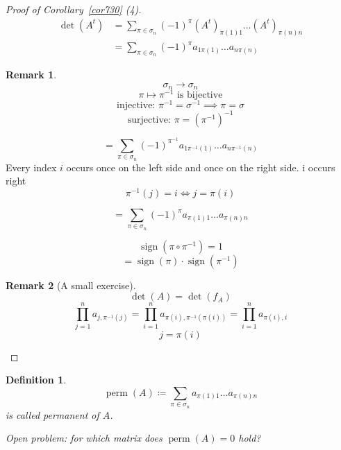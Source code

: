 \documentclass{article}
\newtheorem{definition}{Definition}  \numberwithin{definition}{section}
\newtheorem{remark}{Remark}  \numberwithin{remark}{section}
\DeclareMathOperator{\perm}{perm}
\DeclareMathOperator{\sign}{sign}
\begin{document}
\begin{proof}[Proof of Corollary~\ref{cor730} (4)]
  \begin{align*}
    \det(A^t) &= \sum_{\pi \in \sigma_n} (-1)^\pi (A^t)_{\pi(1) 1} \dots (A^t)_{\pi(n) n} \\
      &= \sum_{\pi \in \sigma_n} (-1)^\pi a_{1 \pi(1)} \dots a_{n \pi(n)}
  \end{align*}

  \begin{remark}
    \[ \sigma_n \to \sigma_n \]
    \[ \pi \mapsto \pi^{-1} \text{ is bijective} \]
    \[ \text{injective: } \pi^{-1} = \sigma^{-1} \implies \pi = \sigma \]
    \[ \text{surjective: } \pi = (\pi^{-1})^{-1} \]
  \end{remark}

  \[ = \sum_{\pi \in \sigma_n} (-1)^{\pi^{-1}} a_{1 \pi^{-1}(1)} \dots a_{n \pi^{-1}(n)} \]
  Every index $i$ occurs once on the left side and once on the right side. i occurs right
  \[ \pi^{-1}(j) = i  \iff  j = \pi(i) \]

  \[ = \sum_{\pi \in \sigma_n} (-1)^\pi a_{\pi(1) 1} \dots a_{\pi(n) n} \]

  \[ \sign(\pi \circ \pi^{-1}) = 1 \]
  \[ = \sign(\pi) \cdot \sign(\pi^{-1}) \]

  \begin{remark}[A small exercise]
    \[ \det(A) = \det(f_A) \]
    \[
      \prod_{j=1}^n a_{j, \pi^{-1}(j)}
      = \prod_{i=1}^n a_{\pi(i), \pi^{-1}(\pi(i))}
      = \prod_{i=1}^n a_{\pi(i), i}
    \] \[
      j = \pi(i)
    \]
  \end{remark}
\end{proof}

\begin{definition}
  \[ \perm(A) \coloneqq \sum_{\pi \in \sigma_n} a_{\pi(1) 1} \dots a_{\pi(n) n} \]
  is called \emph{permanent of $A$}.

  Open problem: for which matrix does $\perm(A) = 0$ hold?
\end{definition}
\end{document}
